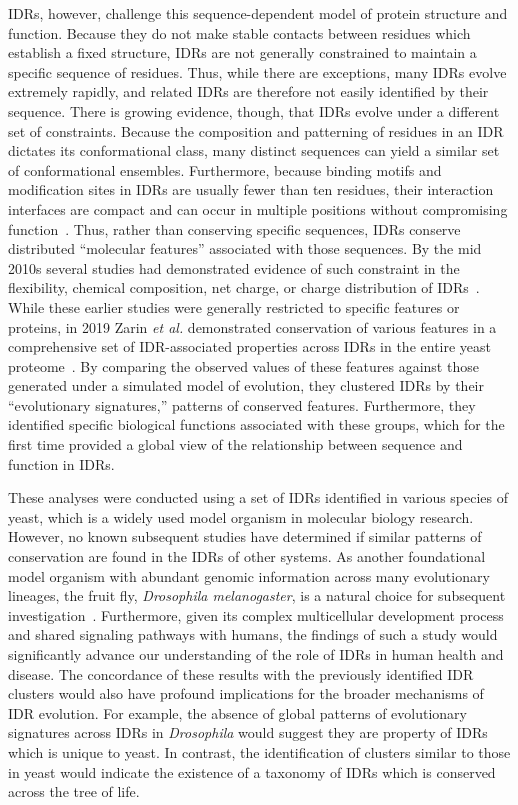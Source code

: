 IDRs, however, challenge this sequence-dependent model of protein structure and function. Because they do not make stable contacts between residues which establish a fixed structure, IDRs are not generally constrained to maintain a specific sequence of residues. Thus, while there are exceptions, many IDRs evolve extremely rapidly, and related IDRs are therefore not easily identified by their sequence. There is growing evidence, though, that IDRs evolve under a different set of constraints. Because the composition and patterning of residues in an IDR dictates its conformational class, many distinct sequences can yield a similar set of conformational ensembles. Furthermore, because binding motifs and modification sites in IDRs are usually fewer than ten residues, their interaction interfaces are compact and can occur in multiple positions without compromising function~\cite{Tompa2014}. Thus, rather than conserving specific sequences, IDRs conserve distributed ``molecular features'' associated with those sequences. By the mid 2010s several studies had demonstrated evidence of such constraint in the flexibility, chemical composition, net charge, or charge distribution of IDRs~\cite{Daughdrill2007, Moesa2012, Zarin2017, Beh2012}. While these earlier studies were generally restricted to specific features or proteins, in 2019 Zarin \textit{et al.} demonstrated conservation of various features in a comprehensive set of IDR-associated properties across IDRs in the entire yeast proteome~\cite{Zarin2019}. By comparing the observed values of these features against those generated under a simulated model of evolution, they clustered IDRs by their ``evolutionary signatures,''  patterns of conserved features. Furthermore, they identified specific biological functions associated with these groups, which for the first time provided a global view of the relationship between sequence and function in IDRs.

These analyses were conducted using a set of IDRs identified in various species of yeast, which is a widely used model organism in molecular biology research. However, no known subsequent studies have determined if similar patterns of conservation are found in the IDRs of other systems. As another foundational model organism with abundant genomic information across many evolutionary lineages, the fruit fly, \textit{Drosophila melanogaster}, is a natural choice for subsequent investigation~\cite{Yang2018, Miller2018, Kim2021}. Furthermore, given its complex multicellular development process and shared signaling pathways with humans, the findings of such a study would significantly advance our understanding of the role of IDRs in human health and disease. The concordance of these results with the previously identified IDR clusters would also have profound implications for the broader mechanisms of IDR evolution. For example, the absence of global patterns of evolutionary signatures across IDRs in \textit{Drosophila} would suggest they are property of IDRs which is unique to yeast. In contrast, the identification of clusters similar to those in yeast would indicate the existence of a taxonomy of IDRs which is conserved across the tree of life.

